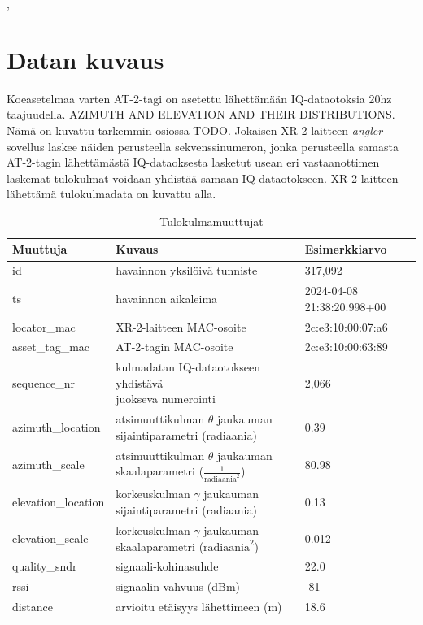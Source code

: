 \documentclass[
  12pt,
  a4paper, twoside]{book}
\begin{document}
,

\section{Datan kuvaus}

Koeasetelmaa varten AT-2-tagi on asetettu lähettämään IQ-dataotoksia 20hz taajuudella. AZIMUTH AND ELEVATION AND THEIR DISTRIBUTIONS. Nämä on kuvattu tarkemmin osiossa TODO. Jokaisen XR-2-laitteen \emph{angler}-sovellus laskee näiden perusteella sekvenssinumeron, jonka perusteella samasta AT-2-tagin lähettämästä IQ-dataoksesta lasketut usean eri vastaanottimen laskemat tulokulmat voidaan yhdistää samaan IQ-dataotokseen. XR-2-laitteen lähettämä tulokulmadata on kuvattu alla.

\def\arraystretch{1.25} 
\begin{table}[H]
\centering
\begin{tabular}{|l|l|l|}
\hline
Muuttuja & Kuvaus & Esimerkkiarvo\\
\hline
id & havainnon yksilöivä tunniste & 317,092 \\
ts & havainnon aikaleima & 2024-04-08 21:38:20.998+00\\
locator\_mac & XR-2-laitteen MAC-osoite & 2c:e3:10:00:07:a6
\\
asset\_tag\_mac & AT-2-tagin MAC-osoite & 2c:e3:10:00:63:89\\
sequence\_nr & \makecell[l]{kulmadatan IQ-dataotokseen yhdistävä \\ juokseva numerointi} & 2,066\\
azimuth\_location & \makecell[l]{atsimuuttikulman $\theta$ \\ jaukauman sijaintiparametri (radiaania)} & 0.39
\\
azimuth\_scale & \makecell[l]{atsimuuttikulman $\theta$ \\ jaukauman skaalaparametri ($\frac{1}{\text{radiaania}^2}$)} & 80.98
\\
elevation\_location & \makecell[l]{korkeuskulman $\gamma$ \\ jaukauman sijaintiparametri (radiaania)} & 0.13
\\
elevation\_scale & \makecell[l]{korkeuskulman $\gamma$ \\ jaukauman skaalaparametri ($\text{radiaania}^2$)} & 0.012
\\
quality\_sndr & signaali-kohinasuhde & 22.0 \\
rssi & signaalin vahvuus (dBm) & -81\\
distance & arvioitu etäisyys lähettimeen (m) & 18.6\\
\hline
\end{tabular}
\caption{Tulokulmamuuttujat}
\label{tab:aoa-muuttujat}
\end{table}
\end{document}
